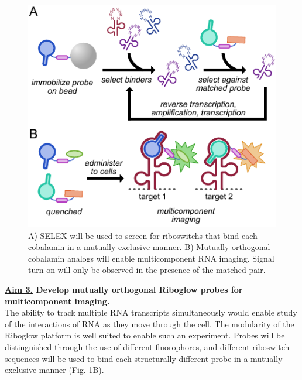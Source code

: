 \begin{figure}
\begin{centering}
\includegraphics[width=\textwidth]{figures/aim3v2.pdf}
\end{centering}
\footnotesize
\caption{\label{figure:aim3}
A) SELEX will be used to screen for riboswitchs that bind each cobalamin in a mutually-exclusive manner. B) Mutually orthogonal cobalamin analogs will enable multicomponent RNA imaging. Signal turn-on will only be observed in the presence of the matched pair.
}
\end{figure}

\textbf{\underline{Aim 3.} Develop mutually orthogonal Riboglow probes for multicomponent imaging.}\\
The ability to track multiple RNA transcripts simultaneously would enable study of the interactions of RNA as they move through the cell. 
The modularity of the Riboglow platform is well suited to enable such an experiment. Probes will be distinguished through the use of different fluorophores, and different riboswitch sequences will be used to bind each structurally different probe in a mutually exclusive manner (Fig. \ref{figure:aim3}B).

